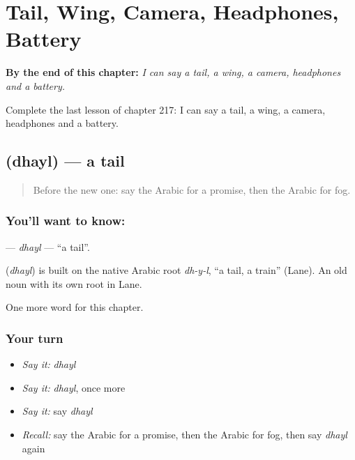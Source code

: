 
\chapter{Tail, Wing, Camera, Headphones, Battery}
\label{ch:ar-tail-wing-camera-headphones-battery}

\begin{chapteropening}
\textbf{By the end of this chapter:} \emph{I can say a tail, a wing, a camera, headphones and a battery.}

Complete the last lesson of chapter 217: I can say a tail, a wing, a camera, headphones and a battery.
\end{chapteropening}

\section[\texorpdfstring{\ar{ذيل} (dhayl)}{ذيل (dhayl)}]{ (dhayl) — a tail}

\label{lesson:AR-C217-dhayl}



\begin{quote}
Before the new one: say the Arabic for a promise, then the Arabic for fog.
\end{quote}

\subsection*{You'll want to know: }
\textbf{} — \emph{dhayl} — \textquotedblleft{}a tail\textquotedblright{}.

\begin{cousinweb}
\textbf{} (\emph{dhayl}) is built on the native Arabic root \emph{dh-y-l}, \textquotedblleft{}a tail, a train\textquotedblright{} (Lane). An old noun with its own root in Lane.
\end{cousinweb}

\begin{grammarlens}[title={What you've built}]
One more word for this chapter.
\end{grammarlens}

\subsection*{Your turn}
\begin{itemize}
\raggedright
  \item \emph{Say it:} \emph{dhayl}
  \item \emph{Say it:} \emph{dhayl}, once more
  \item \emph{Say it:} say \emph{dhayl}
  \item \emph{Recall:} say the Arabic for a promise, then the Arabic for fog, then say \emph{dhayl} again
\end{itemize}

